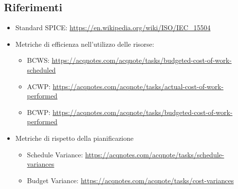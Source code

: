 \subsection{Riferimenti}
\begin{itemize}
    \item Standard SPICE: \newline \url{https://en.wikipedia.org/wiki/ISO/IEC_15504}
    \item Metriche di efficienza nell'utilizzo delle risorse:
    \begin{itemize}
        \item BCWS: \url{https://acqnotes.com/acqnote/tasks/budgeted-cost-of-work-scheduled}
        \item ACWP: \url{https://acqnotes.com/acqnote/tasks/actual-cost-of-work-performed}
        \item BCWP: \url{https://acqnotes.com/acqnote/tasks/budgeted-cost-of-work-performed}
    \end{itemize}
    \item Metriche di rispetto della pianificazione
    \begin{itemize}
        \item Schedule Variance: \url{https://acqnotes.com/acqnote/tasks/schedule-variances}
        \item Budget Variance: \url{https://acqnotes.com/acqnote/tasks/cost-variances}
    \end{itemize}
\end{itemize}

